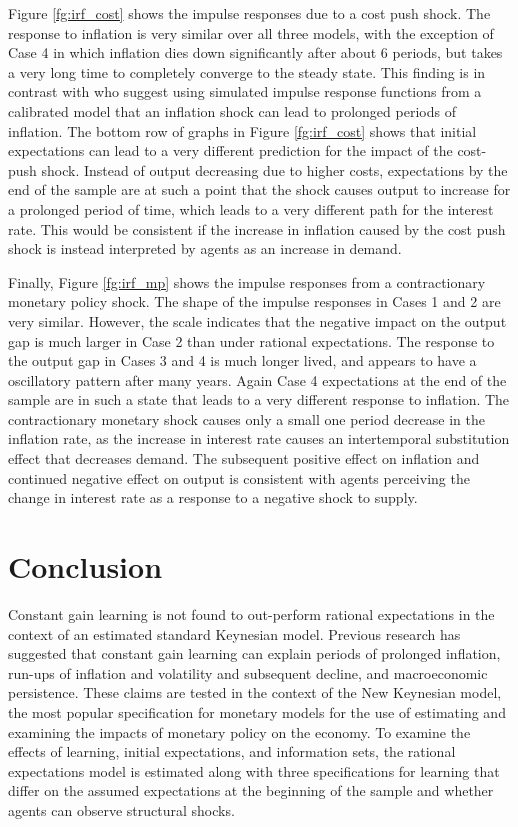 Figure \ref{fg:irf_cost} shows the impulse responses due to a cost push shock.  The response to inflation is very similar over all three models, with the exception of Case 4 in which inflation dies down significantly after about 6 periods, but takes a very long time to completely converge to the steady state.  This finding is in contrast with  who suggest using simulated impulse response functions from a calibrated model that an inflation shock can lead to prolonged periods of inflation.  The bottom row of graphs in Figure \ref{fg:irf_cost} shows that initial expectations can lead to a very different prediction for the impact of the cost-push shock.  Instead of output decreasing due to higher costs, expectations by the end of the sample are at such a point that the shock causes output to increase for a prolonged period of time, which leads to a very different path for the interest rate.  This would be consistent if the increase in inflation caused by the cost push shock is instead interpreted by agents as an increase in demand.

Finally, Figure \ref{fg:irf_mp} shows the impulse responses from a contractionary monetary policy shock.  The shape of the impulse responses in Cases 1 and 2 are very similar.  However, the scale indicates that the negative impact on the output gap is much larger in Case 2 than under rational expectations.  The response to the output gap in Cases 3 and 4 is much longer lived, and appears to have a oscillatory pattern after many years.  Again Case 4 expectations at the end of the sample are in such a state that leads to a very different response to inflation.  The contractionary monetary shock causes only a small one period decrease in the inflation rate, as the increase in interest rate causes an intertemporal substitution effect that decreases demand.  The subsequent positive effect on inflation and continued negative effect on output is consistent with agents perceiving the change in interest rate as a response to a negative shock to supply.  

\section{Conclusion}

Constant gain learning is not found to out-perform rational expectations in the context of an estimated standard Keynesian model.  Previous research has suggested that constant gain learning can explain periods of prolonged inflation, run-ups of inflation and volatility and subsequent decline, and macroeconomic persistence.  These claims are tested in the context of the New Keynesian model, the most popular specification for monetary models for the use of estimating and examining the impacts of monetary policy on the economy.  To examine the effects of learning, initial expectations, and information sets, the rational expectations model is estimated along with three specifications for learning that differ on the assumed expectations at the beginning of the sample and whether agents can observe structural shocks.

